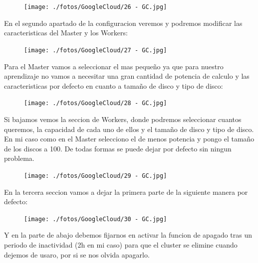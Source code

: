 \documentclass[a4paper,10pt]{article}
\begin{document}
\begin{figure}[H]
\begin{center}
\texttt{[image: ./fotos/GoogleCloud/26 - GC.jpg]}
\end{center}
\end{figure}

En el segundo apartado de la configuracion veremos y podremos modificar las caracteristicas del Master y los Workers:

\begin{figure}[H]
\begin{center}
\texttt{[image: ./fotos/GoogleCloud/27 - GC.jpg]}
\end{center}
\end{figure}

Para el Master vamos a seleccionar el mas pequeño ya que para nuestro aprendizaje no vamos a necesitar una gran cantidad de potencia de calculo y las caracteristicas por defecto en cuanto a tamaño de disco y tipo de disco:

\begin{figure}[H]
\begin{center}
\texttt{[image: ./fotos/GoogleCloud/28 - GC.jpg]}
\end{center}
\end{figure}

Si bajamos vemos la seccion de Workers, donde podremos seleccionar cuantos queremos, la capacidad de cada uno de ellos y el tamaño de disco y tipo de disco. En mi caso como en el Master selecciono el de menos potencia y pongo el tamaño de los discos a 100. De todas formas se puede dejar por defecto sin ningun problema.

\begin{figure}[H]
\begin{center}
\texttt{[image: ./fotos/GoogleCloud/29 - GC.jpg]}
\end{center}
\end{figure}

En la tercera seccion vamos a dejar la primera parte de la siguiente manera por defecto:

\begin{figure}[H]
\begin{center}
\texttt{[image: ./fotos/GoogleCloud/30 - GC.jpg]}
\end{center}
\end{figure}

Y en la parte de abajo debemos fijarnos en activar la funcion de apagado tras un periodo de inactividad (2h en mi caso) para que el cluster se elimine cuando dejemos de usaro, por si se nos olvida apagarlo.
\end{document}
